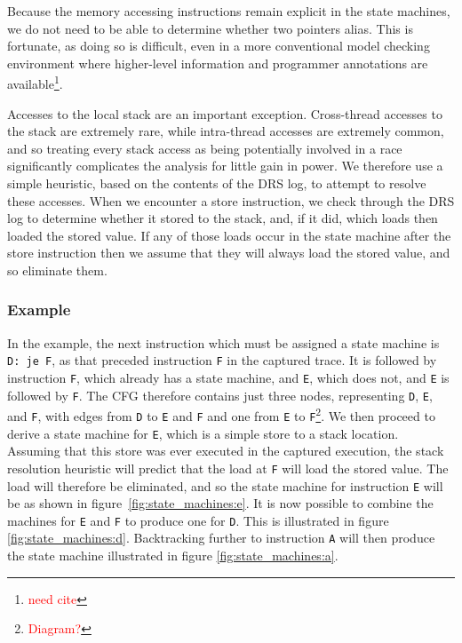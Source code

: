\documentclass[10pt,twocolumn,preprint,natbib,authoryear]{sigplanconf}
\newcommand{\editorial}[1]{\textcolor{red}{\footnote{\textcolor{red}{#1}}}}
\newcommand{\needCite}{\editorial{need cite}}
\begin{document}
Because the memory accessing instructions remain explicit in the state
machines, we do not need to be able to determine whether two pointers
alias.  This is fortunate, as doing so is difficult, even in a more
conventional model checking environment where higher-level information
and programmer annotations are available\needCite{}.

Accesses to the local stack are an important exception.  Cross-thread
accesses to the stack are extremely rare, while intra-thread accesses
are extremely common, and so treating every stack access as being
potentially involved in a race significantly complicates the analysis
for little gain in power.  We therefore use a simple heuristic, based
on the contents of the DRS log, to attempt to resolve these accesses.
When we encounter a store instruction, we check through the DRS log to
determine whether it stored to the stack, and, if it did, which loads
then loaded the stored value.  If any of those loads occur in the
state machine after the store instruction then we assume that they
will always load the stored value, and so eliminate them.

\subsubsection{Example}

In the example, the next instruction which must be assigned a state
machine is \verb|D: je F|, as that preceded instruction \verb|F| in
the captured trace.  It is followed by instruction \verb|F|, which
already has a state machine, and \verb|E|, which does not, and
\verb|E| is followed by \verb|F|.  The CFG therefore contains just
three nodes, representing \verb|D|, \verb|E|, and \verb|F|, with edges
from \verb|D| to \verb|E| and \verb|F| and one from \verb|E| to
\verb|F|\editorial{Diagram?}.  We then proceed to derive a state
machine for \verb|E|, which is a simple store to a stack location.
Assuming that this store was ever executed in the captured execution,
the stack resolution heuristic will predict that the load at \verb|F|
will load the stored value.  The load will therefore be eliminated,
and so the state machine for instruction \verb|E| will be as shown in
figure~\ref{fig:state_machines:e}.  It is now possible to combine the
machines for \verb|E| and \verb|F| to produce one for \verb|D|.  This
is illustrated in figure \ref{fig:state_machines:d}.
Backtracking further to instruction \verb|A| will then produce the
state machine illustrated in figure \ref{fig:state_machines:a}.
\end{document}
